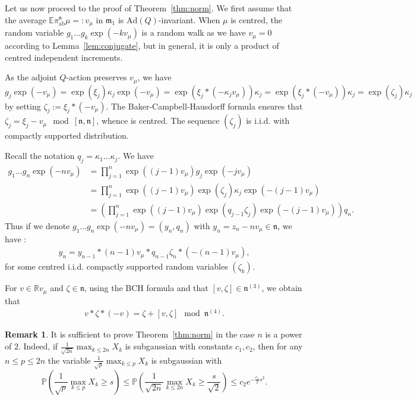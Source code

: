 \documentclass[11pt,leqno]{article}
\theoremstyle{plain}
\theoremstyle{definition}
\newtheorem{remark}[theorem]{Remark}
\theoremstyle{remark}
\numberwithin{equation}{section}
\newcommand{\R}{\mathbb{R}}
\begin{document}
Let us now proceed to the proof of Theorem~\ref{thm:norm}. We first assume that the average $\mathbb{E}\pi_{\mathrm{ab}}^{\mathfrak{n}}\mu=:v_\mu$ in $\mathfrak{m}_1$ is $\mathrm{Ad}(Q)$-invariant. When $\mu$ is centred, the random variable $g_{1}\ldots g_{k}\exp\left(-kv_{\mu}\right)$ is a random walk as we have $v_\mu=0$ according to Lemma~\ref{lem:conjugate}, but in general, it is only a product of centred independent increments.

As the adjoint $Q$-action preserves $v_\mu$, we have 
\[
g_j \exp(-v_\mu)=\exp(\xi_j)\kappa_j\exp(-v_\mu)=\exp(\xi_j\ast(-\kappa_jv_\mu))\kappa_j=\exp(\xi_j\ast(-v_\mu))\kappa_j=\exp(\zeta_j)\kappa_j
\]
 by setting $\zeta_j:=\xi_j\ast(-v_\mu)$. The Baker-Campbell-Hausdorff formula ensures that $\zeta_j=\xi_j-v_\mu \mod [\mathfrak{n},\mathfrak{n}]$, whence is centred. The sequence $(\zeta_j)$ is i.i.d. with compactly supported distribution.

Recall the notation $q_j=\kappa_1\dots\kappa_j$. We have 
\begin{align*}
g_{1}\ldots g_{n}\exp\left(-nv_{\mu}\right) & = \prod_{j=1}^n \exp\left((j-1)v_\mu\right)g_j \exp\left(-jv_\mu\right) \\
& = \prod_{j=1}^n \exp\left((j-1)v_\mu\right)\exp(\zeta_j)\kappa_j \exp\left(-(j-1)v_\mu\right) \\
& = \left( \prod_{j=1}^n \exp\left((j-1)v_\mu\right)\exp(q_{j-1}\zeta_j) \exp\left(-(j-1)v_\mu\right) \right) q_n.
\end{align*}
Thus if we denote $g_{1}\ldots g_{n}\exp\left(-nv_{\mu}\right)=(y_n,q_n)$ with $y_n=z_n-nv_\mu \in \mathfrak{n}$, we have :
\begin{align}\label{eq:increment}
y_n=y_{n-1}\ast (n-1)v_\mu \ast q_{n-1}\zeta_n\ast \left( -(n-1)v_\mu\right),
\end{align}
for some centred i.i.d. compactly supported random variables $(\zeta_k)$.

For $v \in \R v_\mu$ and $\zeta\in \mathfrak{n}$, using the BCH formula and that $[v,\zeta]\in \mathfrak{n}^{(3)}$, we obtain that
\begin{align}\label{eq:modn4}
v\ast\zeta\ast(-v) = \zeta+[v,\zeta] \mod \mathfrak{n}^{(4)}.
\end{align}

\begin{remark}\label{rk:power2}
It is sufficient to prove Theorem~\ref{thm:norm} in the case $n$ is a power of $2$. Indeed, if $\frac{1}{\sqrt{2n}}\max_{k\le 2n}X_k$ is subgaussian with constants $c_1,c_2$, then for any $n\le p \le 2n$ the variable $\frac{1}{\sqrt{p}}\max_{k\le p}X_k$ is subgaussian with
\[
\mathbb{P}\left(\frac{1}{\sqrt{p}}\max_{k\le p}X_k \ge s\right)\le 
\mathbb{P}\left(\frac{1}{\sqrt{2n}}\max_{k\le 2n}X_k \ge \frac{s}{\sqrt{2}}\right) \le c_2e^{-\frac{c_1}{2}s^2}.
\]
\end{remark}
\end{document}
